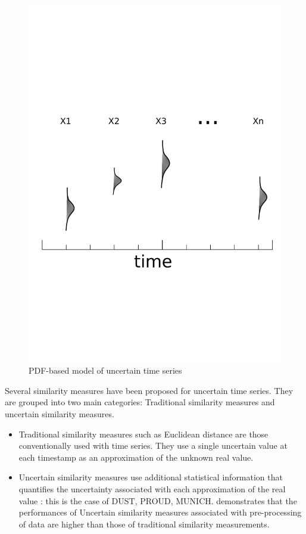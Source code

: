   \begin{figure}
  \centering
   \includegraphics[scale=0.4]{images/pdf2}
  \caption{PDF-based model of uncertain time series}
  \label{pdf}
  \end{figure}
  


Several similarity measures have been proposed for uncertain time series. They are grouped into two main categories: Traditional similarity measures and uncertain similarity measures.

\begin{itemize}
  \item Traditional similarity measures such as Euclidean distance are those conventionally used with time series. They use a single uncertain value at each timestamp as an approximation of
  the unknown real value.
  \item Uncertain similarity measures use additional statistical information that quantifies the uncertainty associated with each approximation of the real value : this is the case of
  DUST, PROUD, MUNICH\cite{dallachiesa}. \cite{Orang2015} demonstrates that the performances of Uncertain similarity measures associated with pre-processing of data are higher than those of traditional similarity measurements.
\end{itemize}


